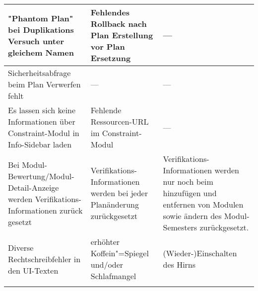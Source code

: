 \begin{longtable}{| >{\hspace{0pt}} p{} | >{\hspace{0pt}} p{} | >{\hspace{0pt}} p{} | }
	\hline
	"Phantom Plan" bei Duplikations Versuch unter gleichem Namen & Fehlendes Rollback nach Plan Erstellung vor Plan Ersetzung & --- \\
	\hline
	Sicherheitsabfrage beim Plan Verwerfen fehlt & --- & --- \\
	\hline
	Es lassen sich keine Informationen über Constraint-Modul in Info-Sidebar laden & Fehlende Ressourcen-URL im Constraint-Modul & --- \\
	\hline
	Bei Modul-Bewertung/Modul-Detail-Anzeige werden Verifikations-Informationen zurück gesetzt & Verifikations-Informationen werden bei jeder Planänderung zurückgesetzt & Verifikations-Informationen werden nur noch beim hinzufügen und entfernen von Modulen sowie ändern des Modul-Semesters zurückgesetzt. \\
	\hline
	Diverse Rechtschreibfehler in den UI-Texten & erhöhter Koffein"=Spiegel und/oder Schlafmangel & (Wieder-)Einschalten des Hirns \\
	\hhline{|=|=|=|}
\end{longtable}